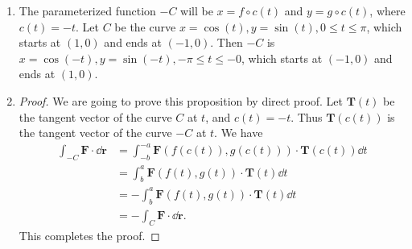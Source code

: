 \documentclass[8pt,twocolumn]{article}
\begin{document}
\begin{Answer}[number=37]
  \begin{enumerate}
    \item The parameterized function $-C$ will be $x=f\circ c (t)$ and $y =
      g\circ c (t)$, where $c(t) = -t$. Let $C$ be the curve $x=\cos(t),
      y=\sin(t), 0\le t\le \pi$, which starts at $(1,0)$ and ends at $(-1,0)$.
      Then $-C$ is $x=\cos(-t), y=\sin(-t), -\pi \le t\le -0$, which starts at
      $(-1,0)$ and ends at $(1,0)$.

    \item \begin{proof}
        We are going to prove this proposition by direct proof. Let $\bm{T}(t)$
        be the tangent vector of the curve $C$ at $t$, and $c(t) = -t$. Thus
        $\bm{T}(c(t))$ is the tangent vector of the curve $-C$ at $t$. We have
        \begin{align*}
          \int_{-C} \bm{F}\cdot \dd{\bm{r}} &= \int_{-b}^{-a} \bm{F}(f(c(t)),
          g(c(t))) \cdot \bm{T}(c(t)) \dd{t} \\
          &= \int_{b}^{a} \bm{F}(f(t), g(t)) \cdot \bm{T}(t) \dd{t} \\
          &= -\int_{b}^{a} \bm{F}(f(t), g(t)) \cdot \bm{T}(t) \dd{t} \\
          &= -\int_C \bm{F}\cdot \dd{\bm{r}}.
        \end{align*}
        This completes the proof.
    \end{proof}
  \end{enumerate}
\end{Answer}
\end{document}
